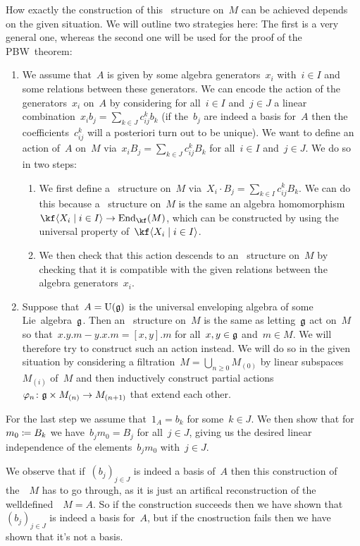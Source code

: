 \begin{construction}
  How exactly the construction of this~{} structure on~$M$ can be achieved depends on the given situation.
  We will outline two strategies here:
  The first is a very general one, whereas the second one will be used for the proof of the PBW~theorem:
  \begin{enumerate}
    \item
      We assume that~$A$ is given by some algebra generators~$x_i$ with~$i \in I$ and some relations between these generators.
      We can encode the action of the generators~$x_i$ on~$A$ by considering for all~$i \in I$ and~$j \in J$ a linear combination~$x_i b_j = \sum_{k \in J} c_{ij}^k b_k$ (if the~$b_j$ are indeed a basis for~$A$ then the coefficients~$c_{ij}^k$ will a posteriori turn out to be unique).
      We want to define an action of~$A$ on~$M$ via~$x_i B_j = \sum_{k \in J} c_{ij}^k B_k$ for all~$i \in I$ and~$j \in J$.
      We do so in two steps:
      \begin{enumerate}
        \item
          We first define a~{} structure on~$M$ via~$X_i \cdot B_j = \sum_{k \in I} c_{ij}^k B_k$.
          We can do this because a~{} structure on~$M$ is the same an algebra homomorphism~$\kf\gen{X_i \suchthat i \in I} \to \End_{\kf}(M)$, which can be constructed by using the universal property of~$\kf\gen{X_i \suchthat i \in I}$.
        \item
          We then check that this action descends to an~{} structure on~$M$ by checking that it is compatible with the given relations between the algebra generators~$x_i$.
      \end{enumerate}
    \item
      Suppose that~$A = \operatorname{U}(\mathfrak{g})$ is the universal enveloping algebra of some Lie~algebra~$\mathfrak{g}$.
      Then an~{} structure on~$M$ is the same as letting~$\mathfrak{g}$ act on~$M$ so that~$x.y.m - y.x.m = [x,y].m$ for all~$x, y \in \mathfrak{g}$ and~$m \in M$.
      We will therefore try to construct such an action instead.
      We will do so in the given situation by considering a filtration~$M = \bigcup_{n \geq 0} M_{(0)}$ by linear subspaces~$M_{(i)}$ of~$M$ and then inductively construct partial actions~$\varphi_n \colon \glie \times M_{(n)} \to M_{(n+1)}$ that extend each other.
  \end{enumerate}
  
  For the last step we assume that~$1_A = b_k$ for some~$k \in J$.
  We then show that for~$m_0 \coloneqq B_k$ we have~$b_j m_0 = B_j$ for all~$j \in J$, giving us the desired linear independence of the elements~$b_j m_0$ with~$j \in J$.

  We observe that if~$(b_j)_{j \in J}$ is indeed a basis of~$A$ then this construction of the~{}~$M$ has to go through, as it is just an artifical reconstruction of the welldefined~{}~$M = A$.
  So if the construction succeeds then we have shown that~$(b_j)_{j \in J}$ is indeed a basis for~$A$, but if the cnostruction fails then we have shown that it’s not a basis.
\end{construction}


